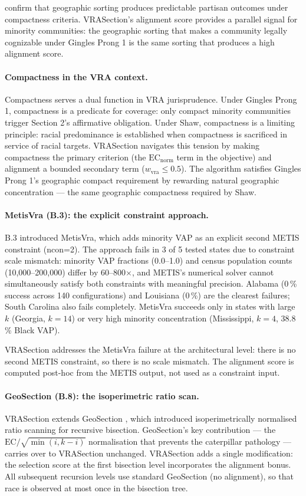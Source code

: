 \citet{chen2013} confirm that geographic sorting produces predictable
partisan outcomes under compactness criteria.
VRASection's alignment score provides a parallel signal for minority
communities: the geographic sorting that makes a community legally cognizable
under Gingles Prong 1 is the same sorting that produces a high alignment score.

\paragraph{Compactness in the VRA context.}
Compactness serves a dual function in VRA jurisprudence.
Under Gingles Prong 1, compactness is a predicate for coverage: only
compact minority communities trigger Section 2's affirmative obligation.
Under Shaw, compactness is a limiting principle: racial predominance is
established when compactness is sacrificed in service of racial targets.
VRASection navigates this tension by making compactness the primary criterion
(the $\mathrm{EC}_\text{norm}$ term in the objective) and alignment a bounded
secondary term ($w_\text{vra} \leq 0.5$).
The algorithm satisfies Gingles Prong 1's geographic compact requirement
by rewarding natural geographic concentration --- the same geographic
compactness required by Shaw.

\paragraph{MetisVra (B.3): the explicit constraint approach.}
B.3 \citep{b3paper} introduced MetisVra, which adds minority VAP as an
explicit second METIS constraint (ncon=2).
The approach fails in 3 of 5 tested states due to constraint scale mismatch:
minority VAP fractions (0.0--1.0) and census population counts
(10,000--200,000) differ by 60--800$\times$, and METIS's numerical solver
cannot simultaneously satisfy both constraints with meaningful precision.
Alabama (0\,\% success across 140 configurations) and Louisiana (0\,\%)
are the clearest failures; South Carolina also fails completely.
MetisVra succeeds only in states with large $k$ (Georgia, $k=14$) or
very high minority concentration (Mississippi, $k=4$, 38.8\,\% Black VAP).

VRASection addresses the MetisVra failure at the architectural level:
there is no second METIS constraint, so there is no scale mismatch.
The alignment score is computed post-hoc from the METIS output, not
used as a constraint input.

\paragraph{GeoSection (B.8): the isoperimetric ratio scan.}
VRASection extends GeoSection \citep{b8paper}, which introduced
isoperimetrically normalised ratio scanning for recursive bisection.
GeoSection's key contribution --- the $\mathrm{EC}/\sqrt{\min(i,k-i)}$
normalisation that prevents the caterpillar pathology --- carries over
to VRASection unchanged.
VRASection adds a single modification: the selection score at the first
bisection level incorporates the alignment bonus.
All subsequent recursion levels use standard GeoSection (no alignment),
so that race is observed at most once in the bisection tree.

